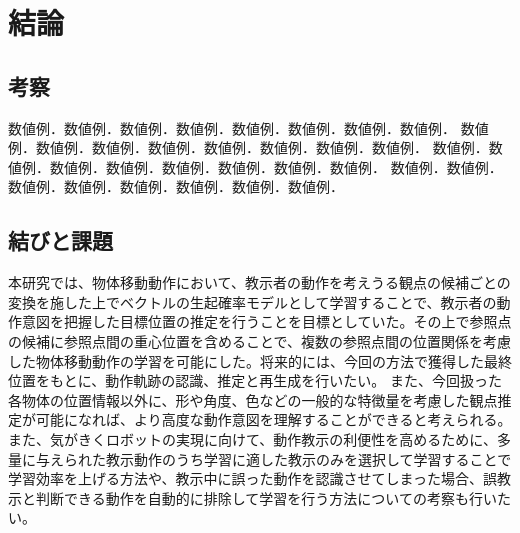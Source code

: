 ﻿%
\chapter{結論}

\section{考察}

数値例．数値例．数値例．数値例．数値例．数値例．数値例．数値例．
数値例．数値例．数値例．数値例．数値例．数値例．数値例．数値例．
数値例．数値例．数値例．数値例．数値例．数値例．数値例．数値例．
数値例．数値例．数値例．数値例．数値例．数値例．数値例．数値例．


\section{結びと課題}

本研究では、物体移動動作において、教示者の動作を考えうる観点の候補ごとの変換を施した上でベクトルの生起確率モデルとして学習することで、教示者の動作意図を把握した目標位置の推定を行うことを目標としていた。その上で参照点の候補に参照点間の重心位置を含めることで、複数の参照点間の位置関係を考慮した物体移動動作の学習を可能にした。将来的には、今回の方法で獲得した最終位置をもとに、動作軌跡の認識、推定と再生成を行いたい。
また、今回扱った各物体の位置情報以外に、形や角度、色などの一般的な特徴量を考慮した観点推定が可能になれば、より高度な動作意図を理解することができると考えられる。
また、気がきくロボットの実現に向けて、動作教示の利便性を高めるために、多量に与えられた教示動作のうち学習に適した教示のみを選択して学習することで学習効率を上げる方法や、教示中に誤った動作を認識させてしまった場合、誤教示と判断できる動作を自動的に排除して学習を行う方法についての考察も行いたい。

